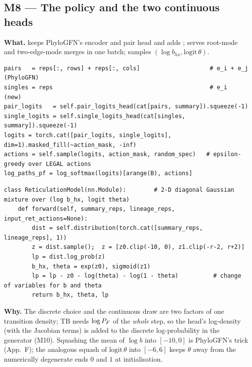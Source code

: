 \subsection{M8 --- The policy and the two continuous heads}
\textbf{What.}  keeps PhyloGFN's encoder and pair head and adds ;  serves root-mode and two-edge-mode merges in one batch;  samples $(\log b_{hx},\mathrm{logit}\,\theta)$.
\begin{lstlisting}
pairs   = reps[:, rows] + reps[:, cols]                    # e_i + e_j   (PhyloGFN)
singles = reps                                             # e_i         (new)
pair_logits   = self.pair_logits_head(cat[pairs, summary]).squeeze(-1)
single_logits = self.single_logits_head(cat[singles, summary]).squeeze(-1)
logits = torch.cat([pair_logits, single_logits], dim=1).masked_fill(~action_mask, -inf)
actions = self.sample(logits, action_mask, random_spec)   # epsilon-greedy over LEGAL actions
log_paths_pf = log_softmax(logits)[arange(B), actions]
\end{lstlisting}
\begin{lstlisting}
class ReticulationModel(nn.Module):        # 2-D diagonal Gaussian mixture over (log b_hx, logit theta)
    def forward(self, summary_reps, lineage_reps, input_ret_actions=None):
        dist = self.distribution(torch.cat([summary_reps, lineage_reps], 1))
        z = dist.sample();  z = [z0.clip(-10, 0), z1.clip(-r-2, r+2)]
        lp = dist.log_prob(z)
        b_hx, theta = exp(z0), sigmoid(z1)
        lp = lp - z0 - log(theta) - log(1 - theta)          # change of variables for b and theta
        return b_hx, theta, lp
\end{lstlisting}
\textbf{Why.} The discrete choice and the continuous draw are two factors of one transition density; TB needs $\log P_F$ of the \emph{whole} step, so the head's log-density (with the Jacobian terms) is added to the discrete log-probability in the generator (M10). Squashing the mean of $\log b$ into $[-10,0]$ is PhyloGFN's trick (App.~F); the analogous squash of $\mathrm{logit}\,\theta$ into $[-6,6]$ keeps $\theta$ away from the numerically degenerate ends $0$ and $1$ at initialisation.


